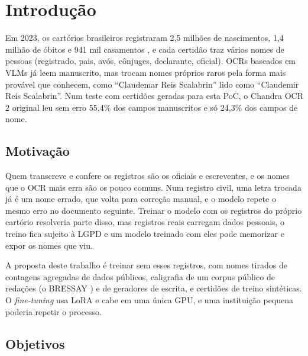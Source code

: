 \section{Introdução}
\label{sec:introducao}

Em 2023, os cartórios brasileiros registraram 2,5 milhões de nascimentos, 1,4 milhão de óbitos e 941 mil casamentos \cite{ibge_rc2023}, e cada certidão traz vários nomes de pessoas (registrado, pais, avós, cônjuges, declarante, oficial). OCRs baseados em VLMs já leem manuscrito, mas trocam nomes próprios raros pela forma mais provável que conhecem, como ``Claudemar Reis Scalabrin'' lido como ``Claudemir Reis Scalabrin''. Num teste com certidões geradas para esta PoC, o Chandra OCR 2 original leu sem erro 55,4\% dos campos manuscritos e só 24,3\% dos campos de nome.

\subsection{Motivação}

Quem transcreve e confere os registros são os oficiais e escreventes, e os nomes que o OCR mais erra são os pouco comuns. Num registro civil, uma letra trocada já é um nome errado, que volta para correção manual, e o modelo repete o mesmo erro no documento seguinte. Treinar o modelo com os registros do próprio cartório resolveria parte disso, mas registros reais carregam dados pessoais, o treino fica sujeito à LGPD e um modelo treinado com eles pode memorizar e expor os nomes que viu.

A proposta deste trabalho é treinar sem esses registros, com nomes tirados de contagens agregadas de dados públicos, caligrafia de um corpus público de redações (o BRESSAY \cite{bressay2023}) e de geradores de escrita, e certidões de treino sintéticas. O \emph{fine-tuning} usa LoRA \cite{lora2022} e cabe em uma única GPU, e uma instituição pequena poderia repetir o processo.

\subsection{Objetivos}

